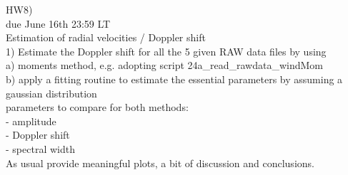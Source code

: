 \begin{taskspec}
HW8)\\

due June 16th 23:59 LT\\

Estimation of radial velocities / Doppler shift\\

1) Estimate the Doppler shift for all the 5 given RAW data files by using\\

a) moments method, e.g. adopting script 24a\_read\_rawdata\_windMom\\
b) apply a fitting routine to estimate the essential parameters by assuming a gaussian distribution\\

parameters to compare for both methods:\\
- amplitude\\
- Doppler shift\\
- spectral width\\

As usual provide meaningful plots, a bit of discussion and conclusions.\\

\end{taskspec}
